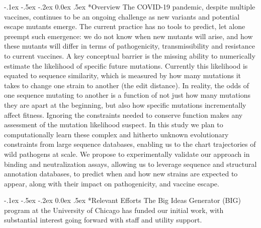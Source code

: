 \documentclass[onecolumn, compsoc,12pt]{IEEEtran}
\makeatletter
\renewcommand\paragraph{\@startsection {section}{1}{\z@}%
                                   {-.1ex \@plus -.5ex \@minus -.2ex}%
                                   {0.0ex \@plus.5ex}%
                                   {\fontsize{11}{10}\selectfont\bfseries\itshape\sffamily\color{black}}}
\def\cov{COVID-19\xspace}
\makeatother
\begin{document}
\paragraph*{Overview} The \cov pandemic, despite multiple vaccines, continues to be an ongoing challenge as new variants and potential escape mutants emerge. The current practice has no tools to predict, let alone preempt such emergence: we do not know when  new mutants  will arise, and how these mutants will differ in terms of pathogenicity, transmissibility and resistance to current vaccines.  A key conceptual barrier  is the missing ability to numerically estimate the likelihood of specific future mutations. Currently this likelihood is  equated to sequence similarity, which is measured by how many mutations it takes to change one strain to another (the edit distance). In reality, the odds of one sequence mutating to another is a function of not just how many mutations they are apart at the beginning, but also how specific mutations incrementally affect fitness. Ignoring the constraints needed to conserve function makes any assessment of the mutation likelihood suspect. In this study we plan to computationally learn these complex and hitherto unknown evolutionary constraints from large sequence databases, enabling us to the chart   trajectories of wild pathogens at scale. We propose to experimentally validate our approach  in binding and neutralization assays,  allowing us to leverage  sequence and structural  annotation databases, to predict when and how new strains are expected to appear, along with their  impact on pathogenicity, and vaccine escape. %

\paragraph*{Relevant Efforts} {\color{Red1} The  Big Ideas Generator (BIG) program at the University of Chicago  has funded our initial work, with  substantial interest going forward with staff and utility support.} 
\end{document}
